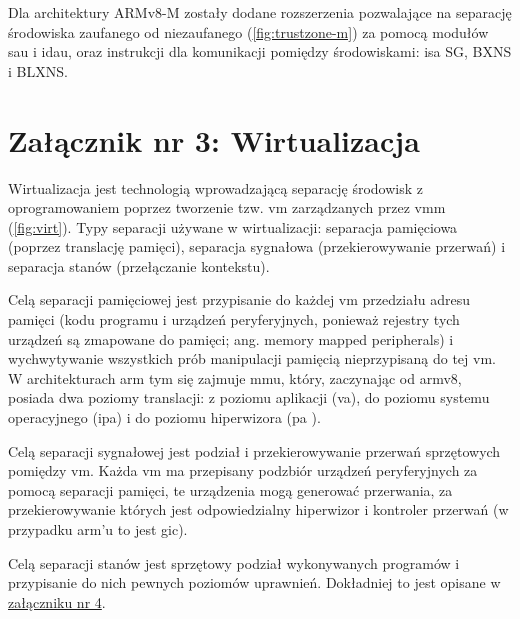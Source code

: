 \documentclass[../main]{subfiles}
\begin{document}
Dla architektury ARMv8-M zostały dodane rozszerzenia pozwalające na separację środowiska zaufanego od
niezaufanego (\cref{fig:trustzone-m}) za pomocą modułów \acrshort{sau} i \acrshort{idau},
oraz instrukcji dla komunikacji pomiędzy środowiskami: \acrshort{isa} SG, BXNS i BLXNS.
\cite{trustzonearmv8m}

\section*{Załącznik nr 3: Wirtualizacja}\label{sec:zalacznik-3}

Wirtualizacja jest technologią wprowadzającą separację środowisk z oprogramowaniem poprzez tworzenie
tzw. \acrshort{vm} zarządzanych przez \acrshort{vmm} (\cref{fig:virt}). Typy separacji używane w
wirtualizacji: separacja pamięciowa (poprzez translację pamięci), separacja sygnałowa (przekierowywanie
przerwań) i separacja stanów (przełączanie kontekstu).

Celą separacji pamięciowej jest przypisanie do każdej \acrshort{vm} przedziału adresu pamięci (kodu
programu i urządzeń peryferyjnych, ponieważ rejestry tych urządzeń są zmapowane do pamięci; ang. memory
mapped peripherals) i wychwytywanie wszystkich prób manipulacji pamięcią nieprzypisaną do tej
\acrshort{vm}. W architekturach \acrshort{arm} tym się zajmuje \acrshort{mmu}, który, zaczynając od
\acrshort{arm}v8, posiada dwa poziomy translacji: z poziomu aplikacji (\acrshort{va}), do poziomu
systemu operacyjnego (\acrshort{ipa}) i do poziomu hiperwizora (\acrshort{pa}
\cite{armv8amemtranslation}).

Celą separacji sygnałowej jest podział i przekierowywanie przerwań sprzętowych pomiędzy \acrshort{vm}.
Każda \acrshort{vm} ma przepisany podzbiór urządzeń peryferyjnych za pomocą separacji pamięci, te
urządzenia mogą generować przerwania, za przekierowywanie których jest odpowiedzialny hiperwizor i
kontroler przerwań (w przypadku \acrshort{arm}'u to jest \acrshort{gic}).

Celą separacji stanów jest sprzętowy podział wykonywanych programów i przypisanie do nich pewnych
poziomów uprawnień. Dokładniej to jest opisane w \hyperref[sec:zalacznik-4]{załączniku nr 4}.

\begin{itemize}
\end{itemize}
\end{document}
